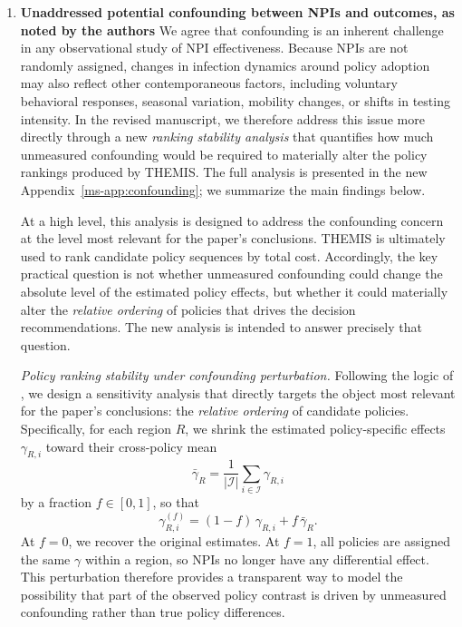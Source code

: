 \documentclass[letterpaper,twoside,11pt]{reviewresponse}
\begin{document}
\begin{enumerate}
	In summary, the revised manuscript now addresses this issue on three distinct margins. First, we show that allowing higher-rank interaction does not improve out-of-sample performance and does not materially change the counterfactual policy estimates of interest. Second, we show that the rank-1 specification substantially improves upon simpler models that ignore either policy heterogeneity or region heterogeneity. Third, we clarify that this modeling choice is consistent with a broader low-rank literature used for counterfactual analysis in related settings. For these reasons, we believe the revision now provides much stronger support for the use of the rank-1 structure as a parsimonious and empirically appropriate approximation for the policy counterfactual analysis carried out in the paper.

\item \textbf{Unaddressed potential confounding between NPIs and outcomes, as noted by the authors}
\label{app:confounding}
We agree that confounding is an inherent challenge in any observational study of NPI effectiveness. Because NPIs are not randomly assigned, changes in infection dynamics around policy adoption may also reflect other contemporaneous factors, including voluntary behavioral responses, seasonal variation, mobility changes, or shifts in testing intensity. In the revised manuscript, we therefore address this issue more directly through a new \emph{ranking stability analysis} that quantifies how much unmeasured confounding would be required to materially alter the policy rankings produced by THEMIS. The full analysis is presented in the new Appendix~\ref*{ms-app:confounding}; we summarize the main findings below.

At a high level, this analysis is designed to address the confounding concern at the level most relevant for the paper's conclusions. THEMIS is ultimately used to rank candidate policy sequences by total cost. Accordingly, the key practical question is not whether unmeasured confounding could change the absolute level of the estimated policy effects, but whether it could materially alter the \emph{relative ordering} of policies that drives the decision recommendations. The new analysis is intended to answer precisely that question.

\textit{Policy ranking stability under confounding perturbation.}  Following the logic of \citet{cinelli2020making}, we design a sensitivity analysis that directly targets the object most relevant for the paper's conclusions: the \emph{relative ordering} of candidate policies. Specifically, for each region $R$, we shrink the estimated policy-specific effects $\gamma_{R,i}$ toward their cross-policy mean
\[
\bar{\gamma}_R = \frac{1}{|\mathcal{I}|}\sum_{i\in\mathcal{I}} \gamma_{R,i}
\]
by a fraction $f \in [0,1]$, so that
\[
\gamma_{R,i}^{(f)} = (1-f)\,\gamma_{R,i} + f\,\bar{\gamma}_R.
\]
At $f=0$, we recover the original estimates. At $f=1$, all policies are assigned the same $\gamma$ within a region, so NPIs no longer have any differential effect. This perturbation therefore provides a transparent way to model the possibility that part of the observed policy contrast is driven by unmeasured confounding rather than true policy differences.


\end{enumerate}
\end{document}
